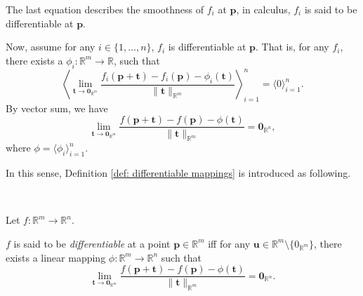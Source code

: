 \begin{observation}
	The last equation describes the smoothness of $f_i$ at $\mathbf p$, in calculus, $f_i$ is said to be differentiable at $\mathbf p$.
	
	Now, assume for any $i \in \{1, \ldots, n\}$, $f_i$ is differentiable at $\mathbf p$. That is, for any $f_i$, there exists a $\phi_i:\mathbb R^m \to \mathbb R$, such that
	$$
	\left\langle\lim_{\mathbf t \to \mathbf 0_{\mathbb R^m}} \frac{f_i(\mathbf p + \mathbf t) - f_i(\mathbf p) - \phi_i(\mathbf t)}{\|\mathbf t\|_{\mathbb R^m}} \right\rangle_{i = 1}^n = \langle 0 \rangle_{i = 1}^n.
	$$
	By vector sum, we have
	$$
	\lim_{\mathbf t \to \mathbf 0_{\mathbb R^m}} \frac{f(\mathbf p + \mathbf t) - f(\mathbf p) - \phi(\mathbf t)}{\|\mathbf t\|_{\mathbb R^m}} = \mathbf 0_{\mathbb R^n},
	$$
	where $\phi = \langle \phi_i \rangle_{i = 1}^n$.
	
	In this sense, Definition \ref{def: differentiable mappings} is introduced as following.
\end{observation}


\begin{definition}
	\
	
	\label{def: differentiable mappings}
	Let $f:\mathbb R^m \to \mathbb R^n$.
	
	$f$ is said to be \textit{differentiable} at a point $\mathbf p \in \mathbb R^m$ iff for any $\mathbf u \in \mathbb R^m \setminus \{0_{\mathbb R^m}\}$, there exists a linear mapping $\phi: \mathbb R^m \to \mathbb R^n$ such that
	$$
	\lim_{\mathbf t \to \mathbf 0_{\mathbb R^m}}\frac{f(\mathbf p + \mathbf t) - f(\mathbf p) - \phi(\mathbf t)}{\| \mathbf t \|_{\mathbb R^m}} = \mathbf 0_{\mathbb R^n}.
	$$
\end{definition}


